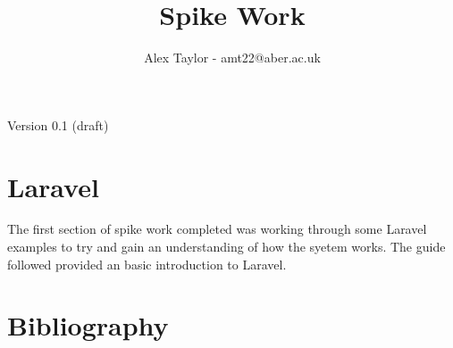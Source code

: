 \documentclass{article}
\title{Spike Work}
\author{Alex Taylor - amt22@aber.ac.uk}
\begin{document}
\maketitle
\begin{center}
	Version 0.1 (draft)
\end{center}
\tableofcontents
\thispagestyle{empty}
\newpage

\section{Laravel}
The first section of spike work completed was working through some Laravel examples to try and gain an understanding of how the syetem works. The guide\cite{Laravel5Guide} followed provided an basic introduction to Laravel.
\newpage

\section{Bibliography}



\end{document}
